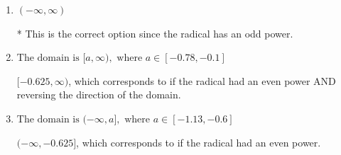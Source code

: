 \documentclass{extbook}[14pt]
\begin{document}
\begin{enumerate}
{\begin{enumerate}[label=\Alph*.]
$[-1.600, \infty)$, which corresponds to if the radical had an even power AND reversing the direction of the domain AND using the negative of the correct pivot value.
\item \( (-\infty, \infty) \)

* This is the correct option since the radical has an odd power.
\item \( \text{The domain is } [a, \infty), \text{   where } a \in [-0.78, -0.1] \)

$[-0.625, \infty)$, which corresponds to if the radical had an even power AND reversing the direction of the domain.
\item \( \text{The domain is } (-\infty, a], \text{   where } a \in [-1.13, -0.6] \)

$(-\infty, -0.625]$, which corresponds to if the radical had an even power.
\end{enumerate}

}
\end{enumerate}
\end{document}
